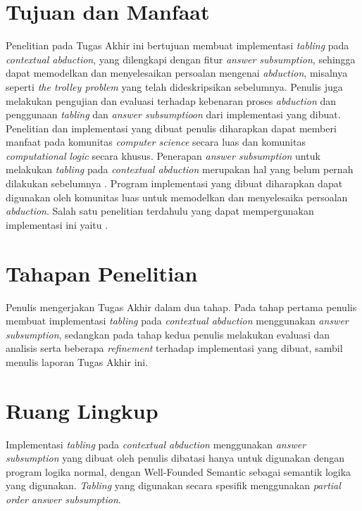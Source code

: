 \section{Tujuan dan Manfaat}
Penelitian pada Tugas Akhir ini bertujuan membuat implementasi \textit{tabling} pada \textit{contextual abduction}, yang dilengkapi dengan fitur \textit{answer subsumption}, sehingga dapat memodelkan dan menyelesaikan persoalan mengenai \textit{abduction}, misalnya seperti \textit{the trolley problem} yang telah dideskripsikan sebelumnya. Penulis juga melakukan pengujian dan evaluasi terhadap kebenaran proses \textit{abduction} dan penggunaan \textit{tabling} dan \textit{answer subsumptioon} dari implementasi yang dibuat. Penelitian dan implementasi yang dibuat penulis diharapkan dapat memberi manfaat pada komunitas \textit{computer science} secara luas dan komunitas \textit{computational logic} secara khusus. Penerapan \textit{answer subsumption} untuk melakukan \textit{tabling} pada \textit{contextual abduction} merupakan hal yang belum pernah dilakukan sebelumnya \citep{pereira2016programming}. Program implementasi yang dibuat diharapkan dapat digunakan oleh komunitas luas untuk memodelkan dan menyelesaika persoalan \textit{abduction}. Salah satu penelitian terdahulu yang dapat mempergunakan implementasi ini yaitu \cite{lazarou2012logical}.

\section{Tahapan Penelitian}
Penulis mengerjakan Tugas Akhir dalam dua tahap. Pada tahap pertama penulis membuat implementasi \textit{tabling} pada \textit{contextual abduction} menggunakan \textit{answer subsumption}, sedangkan pada tahap kedua penulis melakukan evaluasi dan analisis serta beberapa \textit{refinement} terhadap implementasi yang dibuat, sambil menulis laporan Tugas Akhir ini.
\section{Ruang Lingkup}
Implementasi \textit{tabling} pada \textit{contextual abduction} menggunakan \textit{answer subsumption} yang dibuat oleh penulis dibatasi hanya untuk digunakan dengan program logika normal, dengan Well-Founded Semantic sebagai semantik logika yang digunakan. \textit{Tabling} yang digunakan secara spesifik menggunakan \textit{partial order answer subsumption}.

